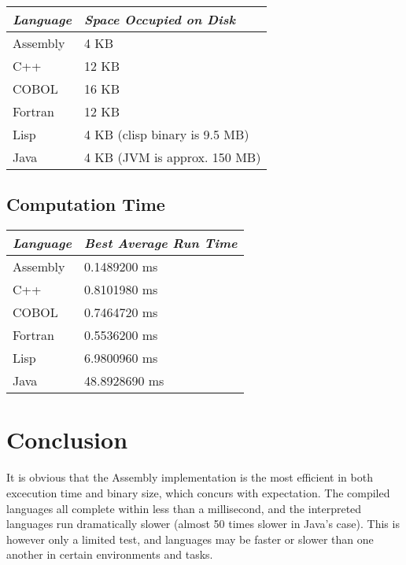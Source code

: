 \documentclass[11pt,a4paper]{article}
\begin{document}
		\begin{center}
		\bgroup
		\def\arraystretch{1.5}
			\begin{tabular}{|l|l|}
				\hline
				\textit{Language} & \textit{Space Occupied on Disk}	\\ \hline
				Assembly & 4 KB                          			\\
				C++      & 12 KB                         			\\
				COBOL    & 16 KB                         			\\
				Fortran  & 12 KB                         			\\
				Lisp     & 4 KB (clisp binary is 9.5 MB) 			\\
				Java     & 4 KB (JVM is approx. 150 MB)  			\\ \hline
			\end{tabular}
		\egroup
		\end{center}
		\space
		\subsection*{Computation Time}
			\space
			\begin{center}
				\bgroup
				\def\arraystretch{1.5}
				\begin{tabular}{|l|l|}
					\hline
					\textit{Language} & \textit{Best Average Run Time} \\ \hline
					Assembly & 0.1489200 ms          \\
					C++      & 0.8101980 ms          \\
					COBOL    & 0.7464720 ms          \\
					Fortran  & 0.5536200 ms          \\
					Lisp     & 6.9800960 ms          \\
					Java     & 48.8928690 ms                     \\ \hline
				\end{tabular}
				\egroup
			\end{center}
	\section*{Conclusion}
	
	It is obvious that the Assembly implementation is the most efficient in both excecution time and binary size, which concurs with expectation. The compiled languages all complete within less than a millisecond, and the interpreted languages run dramatically slower (almost 50 times slower in Java's case). This is however only a limited test, and languages may be faster or slower than one another in certain environments and tasks.
	
\end{document}
